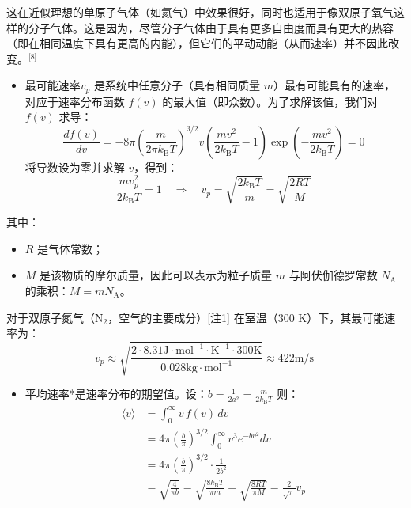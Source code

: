 这在近似理想的单原子气体（如氦气）中效果很好，同时也适用于像双原子氧气这样的分子气体。这是因为，尽管分子气体由于具有更多自由度而具有更大的热容（即在相同温度下具有更高的内能），但它们的平动动能（从而速率）并不因此改变。\(^\text{[8]}\)
\begin{itemize}
\item 最可能速率$v_p$ 是系统中任意分子（具有相同质量 $m$）最有可能具有的速率，对应于速率分布函数 $f(v)$ 的最大值（即众数）。为了求解该值，我们对 $f(v)$ 求导：
$$
\frac{df(v)}{dv} = -8\pi \left( \frac{m}{2\pi k_{\text{B}}T} \right)^{3/2} v \left( \frac{mv^2}{2k_{\text{B}}T} - 1 \right) \exp\left( -\frac{mv^2}{2k_{\text{B}}T} \right) = 0~
$$
将导数设为零并求解 $v$，得到：
$$
\frac{m v_p^2}{2k_{\text{B}} T} = 1 \quad \Rightarrow \quad v_p = \sqrt{\frac{2k_{\text{B}} T}{m}} = \sqrt{\frac{2RT}{M}}~
$$
\end{itemize}
其中：
\begin{itemize}
\item $R$ 是气体常数；
\item $M$ 是该物质的摩尔质量，因此可以表示为粒子质量 $m$ 与阿伏伽德罗常数 $N_{\mathrm{A}}$ 的乘积：$M = m N_{\mathrm{A}}$。
\end{itemize}
对于双原子氮气（$\mathrm{N}_2$，空气的主要成分）[注1] 在室温（300 K）下，其最可能速率为：
$$
v_p \approx \sqrt{ \frac{2 \cdot 8.31 \mathrm{J \cdot mol^{-1} \cdot K^{-1}} \cdot 300 \mathrm{K}}{0.028 \mathrm{kg \cdot mol^{-1}}} } \approx 422 \mathrm{m/s}~
$$
\begin{itemize}
\item 平均速率*是速率分布的期望值。设：$b = \frac{1}{2a^2} = \frac{m}{2k_{\text{B}} T}$
则：
$$
\begin{aligned}
\langle v \rangle &= \int_0^\infty v\, f(v)\, dv \\
&= 4\pi \left( \frac{b}{\pi} \right)^{3/2} \int_0^\infty v^3 e^{-b v^2} dv \\
&= 4\pi \left( \frac{b}{\pi} \right)^{3/2} \cdot \frac{1}{2b^2} \\
&= \sqrt{ \frac{4}{\pi b} } = \sqrt{ \frac{8k_{\text{B}} T}{\pi m} } = \sqrt{ \frac{8RT}{\pi M} } = \frac{2}{\sqrt{\pi}} v_p
\end{aligned}~
$$
\end{itemize}
